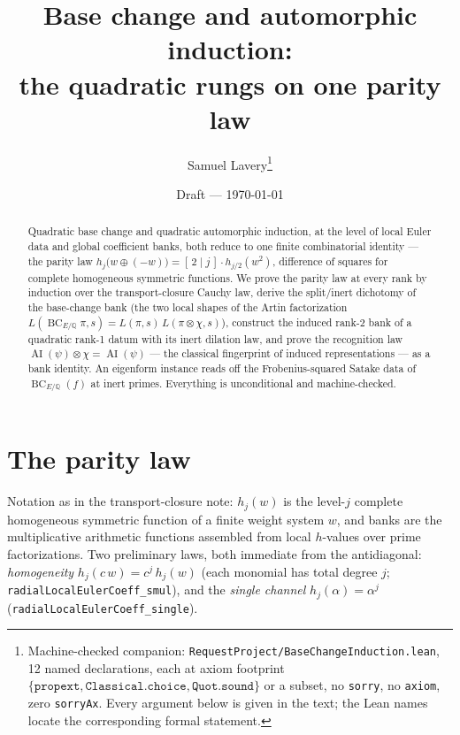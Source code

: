 \documentclass[11pt]{article}
\title{Base change and automorphic induction:\\ the quadratic rungs on one parity law}
\author{Samuel Lavery\thanks{Machine-checked companion:
\texttt{RequestProject/BaseChangeInduction.lean}, 12 named declarations, each at axiom
footprint $\{\texttt{propext},\texttt{Classical.choice},\texttt{Quot.sound}\}$ or a subset,
no \texttt{sorry}, no \texttt{axiom}, zero \texttt{sorryAx}.  Every argument below is given
in the text; the Lean names locate the corresponding formal statement.}}
\date{Draft --- \today}
\newcommand{\AI}{\operatorname{AI}}
\newcommand{\BC}{\operatorname{BC}}
\begin{document}
\maketitle

\begin{abstract}
Quadratic base change and quadratic automorphic induction, at the level of local Euler data
and global coefficient banks, both reduce to one finite combinatorial identity — the parity
law $h_j\bigl(w\oplus(-w)\bigr)=[\,2\mid j\,]\cdot h_{j/2}(w^2)$, difference of squares for
complete homogeneous symmetric functions.  We prove the parity law at every rank by
induction over the transport-closure Cauchy law, derive the split/inert dichotomy of the
base-change bank (the two local shapes of the Artin factorization
$L(\BC_{E/\mathbb Q}\pi,s)=L(\pi,s)\,L(\pi\otimes\chi,s)$), construct the induced rank-2
bank of a quadratic rank-1 datum with its inert dilation law, and prove the recognition law
$\AI(\psi)\otimes\chi=\AI(\psi)$ — the classical fingerprint of induced representations —
as a bank identity.  An eigenform instance reads off the Frobenius-squared Satake data of
$\BC_{E/\mathbb Q}(f)$ at inert primes.  Everything is unconditional and machine-checked.
\end{abstract}

\section{The parity law}

Notation as in the transport-closure note: $h_j(w)$ is the level-$j$ complete homogeneous
symmetric function of a finite weight system $w$, and banks are the multiplicative
arithmetic functions assembled from local $h$-values over prime factorizations.  Two
preliminary laws, both immediate from the antidiagonal: \emph{homogeneity}
$h_j(c\,w)=c^j\,h_j(w)$ (each monomial has total degree $j$;
\texttt{radialLocalEulerCoeff\_smul}), and the \emph{single channel}
$h_j(\alpha)=\alpha^j$ (\texttt{radialLocalEulerCoeff\_single}).
\end{document}
